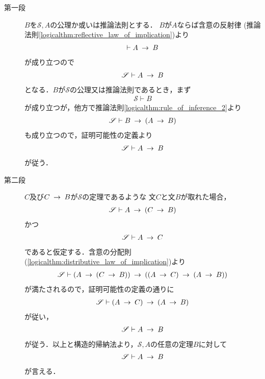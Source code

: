 	\begin{metaprf}\mbox{}
		\begin{description}
			\item[第一段]
				$B$を$\mathscr{S},A$の公理か或いは推論法則とする．
				$B$が$A$ならば含意の反射律
				(推論法則\ref{logicalthm:reflective_law_of_implication})より
				\begin{align}
					\vdash A \hspace{0.25em}\rightarrow\hspace{0.25em} B
				\end{align}
				が成り立つので
				\begin{align}
					\mathscr{S} \vdash A \hspace{0.25em}\rightarrow\hspace{0.25em} B
				\end{align}
				となる．$B$が$\mathscr{S}$の公理又は推論法則であるとき，まず
				\begin{align}
					\mathscr{S} \vdash B
				\end{align}
				が成り立つが，他方で推論法則\ref{logicalthm:rule_of_inference_2}より
				\begin{align}
					\mathscr{S} \vdash B \hspace{0.25em}\rightarrow\hspace{0.25em} (A \hspace{0.25em}\rightarrow\hspace{0.25em} B) 
				\end{align}
				も成り立つので，証明可能性の定義より
				\begin{align}
					\mathscr{S} \vdash A \hspace{0.25em}\rightarrow\hspace{0.25em} B
				\end{align}
				が従う．
				
			\item[第二段]
				$C$及び$C \hspace{0.25em}\rightarrow\hspace{0.25em} B$が$\mathscr{S}$の定理であるような
				文$C$と文$B$が取れた場合，
				\begin{align}
					\mathscr{S} \vdash A \hspace{0.25em}\rightarrow\hspace{0.25em} (C \hspace{0.25em}\rightarrow\hspace{0.25em} B)
				\end{align}
				かつ
				\begin{align}
					\mathscr{S} \vdash A \hspace{0.25em}\rightarrow\hspace{0.25em} C
				\end{align}
				であると仮定する．含意の分配則
				(\ref{logicalthm:distributive_law_of_implication})より
				\begin{align}
					\mathscr{S} \vdash 
					(A \hspace{0.25em}\rightarrow\hspace{0.25em} (C \hspace{0.25em}\rightarrow\hspace{0.25em} B)) \hspace{0.25em}\rightarrow\hspace{0.25em} ((A \hspace{0.25em}\rightarrow\hspace{0.25em} C) \hspace{0.25em}\rightarrow\hspace{0.25em} (A \hspace{0.25em}\rightarrow\hspace{0.25em} B))
				\end{align}
				が満たされるので，証明可能性の定義の通りに
				\begin{align}
					\mathscr{S} \vdash (A \hspace{0.25em}\rightarrow\hspace{0.25em} C) \hspace{0.25em}\rightarrow\hspace{0.25em} (A \hspace{0.25em}\rightarrow\hspace{0.25em} B)
				\end{align}
				が従い，
				\begin{align}
					\mathscr{S} \vdash A \hspace{0.25em}\rightarrow\hspace{0.25em} B
				\end{align}
				が従う．以上と構造的帰納法より，$\mathscr{S},A$の任意の定理$B$に対して
				\begin{align}
					\mathscr{S} \vdash A \hspace{0.25em}\rightarrow\hspace{0.25em} B
				\end{align}
				が言える．
				\QED
		\end{description}
	\end{metaprf}
	
